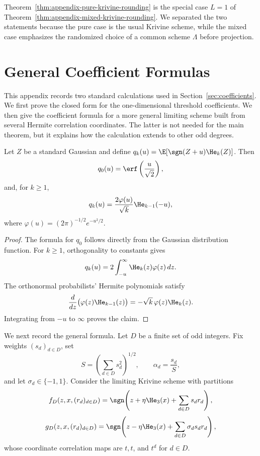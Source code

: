 \begin{remark}
Theorem~\ref{thm:appendix-pure-krivine-rounding} is the special case
\(L=1\) of Theorem~\ref{thm:appendix-mixed-krivine-rounding}. We separated
the two statements because the pure case is the usual Krivine scheme, while
the mixed case emphasizes the randomized choice of a common scheme
\(\Lambda\) before projection.
\end{remark}


\section{General Coefficient Formulas}
\label{app:coefficient-formulas}

This appendix records two standard calculations used in
Section~\ref{sec:coefficients}. We first prove the closed form for the
one-dimensional threshold coefficients. We then give the coefficient
formula for a more general limiting scheme built from several Hermite
correlation coordinates. The latter is not needed for the main theorem,
but it explains how the calculation extends to other odd degrees.

\begin{lemma}
\label{lem:qk}
Let \(Z\) be a standard Gaussian and define
\(
q_k(u)=\E[\sgn(Z+u)\He_k(Z)]
\).
Then
\[
    q_0(u)
    =
    \erf\left(\frac{u}{\sqrt{2}}\right),
\]
and, for \(k\geq 1\),
\[
    q_k(u)
    =
    \frac{2\varphi(u)}{\sqrt{k}}\He_{k-1}(-u),
\]
where \(\varphi(u)=(2\pi)^{-1/2}e^{-u^2/2}\).
\end{lemma}

\begin{proof}
The formula for \(q_0\) follows directly from the Gaussian distribution
function. For \(k\geq 1\), orthogonality to constants gives
\[
    q_k(u)
    =
    2\int_{-u}^{\infty}\He_k(z)\varphi(z)\,dz.
\]
The orthonormal probabilists' Hermite polynomials satisfy
\[
    \frac{d}{dz}
    \bigl(\varphi(z)\He_{k-1}(z)\bigr)
    =
    -\sqrt{k}\,\varphi(z)\He_k(z).
\]
Integrating from \(-u\) to \(\infty\) proves the claim.
\end{proof}

We next record the general formula. Let \(D\) be a finite set of odd
integers. Fix weights \((s_d)_{d\in D}\), set
\[
    S
    =
    \left(\sum_{d\in D}s_d^2\right)^{1/2},
    \qquad
    \alpha_d
    =
    \frac{s_d}{S},
\]
and let \(\sigma_d\in\{-1,1\}\). Consider the limiting Krivine scheme
with partitions
\[
    f_D(z,x,(r_d)_{d\in D})
    =
    \sgn\!\left(
        z+\eta\He_3(x)+\sum_{d\in D}s_dr_d
    \right),
\]
\[
    g_D(z,x,(r_d)_{d\in D})
    =
    \sgn\!\left(
        z-\eta\He_3(x)+\sum_{d\in D}\sigma_ds_dr_d
    \right),
\]
whose coordinate correlation maps are \(t,t\), and \(t^d\) for
\(d\in D\).

